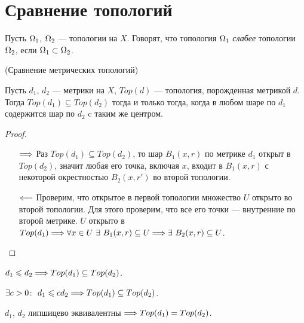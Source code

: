 \section{Сравнение топологий}

\begin{definition}
	Пусть $\Omega_1$, $\Omega_2$ --- топологии на $X$. Говорят, что топология 
	$\Omega_1$ \textit{слабее} топологии $\Omega_2$, если $\Omega_1 \subset \Omega_2$.
\end{definition}

\begin{theorem}(Сравнение метрических топологий)

	Пусть $d_1$, $d_2$ --- метрики на $X$, $Top(d)$ --- топология,
	порожденная метрикой $d$. Тогда $Top(d_1) \subseteq Top(d_2)$
	тогда и только тогда, когда в любом шаре по $d_1$ содержится 
	шар по $d_2$ c таким же центром.
\end{theorem}
\begin{proof}
	\enewline
	\begin{itemize}
		\item[$\Longrightarrow$] Раз $Top(d_1) \subseteq Top(d_2)$, то шар $B_1(x, r)$ по метрике 
			$d_1$ открыт в $Top(d_2)$, значит любая его точка, включая $x$, 
			входит в $B_1(x, r)$ с некоторой окрестностью $B_2(x, r')$ во второй 
			топологии.
		\item[$\Longleftarrow$] Проверим, что открытое в первой топологии множество $U$ открыто
			во второй топологии. Для этого проверим, что все его точки 
			--- внутренние по второй метрике. $U$ открыто в $Top(d_1) \Longrightarrow
			\forall x \in U~ \exists~ B_1(x, r) \subseteq U 
			\Longrightarrow \exists~ B_2(x, r) \subseteq U$. 
	\end{itemize}
\end{proof}

\begin{corollary}
	$d_1 \leqslant d_2 \Longrightarrow Top(d_1) \subseteq Top(d_2)$.
\end{corollary}

\begin{corollary}
	$\exists c > 0\colon~ d_1 \leqslant c d_2 \Longrightarrow Top(d_1) \subseteq Top(d_2)$.
\end{corollary}

\begin{corollary}
	$d_1$, $d_2$ липшицево эквивалентны $\Longrightarrow Top(d_1) = Top(d_2)$.
\end{corollary}

